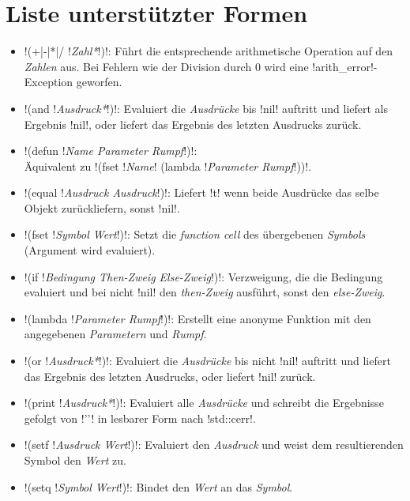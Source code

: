 \section{Liste unterstützter Formen}
\begin{itemize}
\item !(+|-|*|/ !\emph{Zahl*}!)!: Führt die entsprechende arithmetische Operation auf den \emph{Zahlen} aus. Bei Fehlern wie der Division durch $0$ wird eine !arith_error!-Exception geworfen.
\item !(and !\emph{Ausdruck*}!)!:  Evaluiert die \emph{Ausdrücke} bis !nil! auftritt und liefert als Ergebnis !nil!, oder liefert das Ergebnis des letzten Ausdrucks zurück.
\item !(defun !\emph{Name Parameter Rumpf}!)!: \\ Äquivalent zu !(fset !\emph{Name}! (lambda !\emph{Parameter Rumpf}!))!.
\item !(equal !\emph{Ausdruck Ausdruck}!)!: Liefert !t! wenn beide Ausdrücke das selbe Objekt zurückliefern, sonst !nil!.
\item !(fset !\emph{Symbol Wert}!)!: Setzt die \emph{function cell} des übergebenen \emph{Symbols} (Argument wird evaluiert).
\item !(if !\emph{Bedingung Then-Zweig Else-Zweig}!)!: Verzweigung, die die Bedingung evaluiert und bei nicht !nil! den \emph{then-Zweig} ausführt, sonst den \emph{else-Zweig}.
\item !(lambda !\emph{Parameter Rumpf}!)!: Erstellt eine anonyme Funktion mit den angegebenen \emph{Parametern} und \emph{Rumpf}.
\item !(or !\emph{Ausdruck*}!)!: Evaluiert die \emph{Ausdrücke} bis nicht !nil! auftritt und liefert das Ergebnis des letzten Ausdrucks, oder liefert !nil! zurück.
\item !(print !\emph{Ausdruck*}!)!: Evaluiert alle \emph{Ausdrücke} und schreibt die Ergebnisse gefolgt von !'\n'! in lesbarer Form nach !std::cerr!.
\item !(setf !\emph{Ausdruck Wert}!)!: Evaluiert den \emph{Ausdruck} und weist dem resultierenden Symbol den \emph{Wert} zu.
\item !(setq !\emph{Symbol Wert}!)!: Bindet den \emph{Wert} an das \emph{Symbol}.
\end{itemize}
